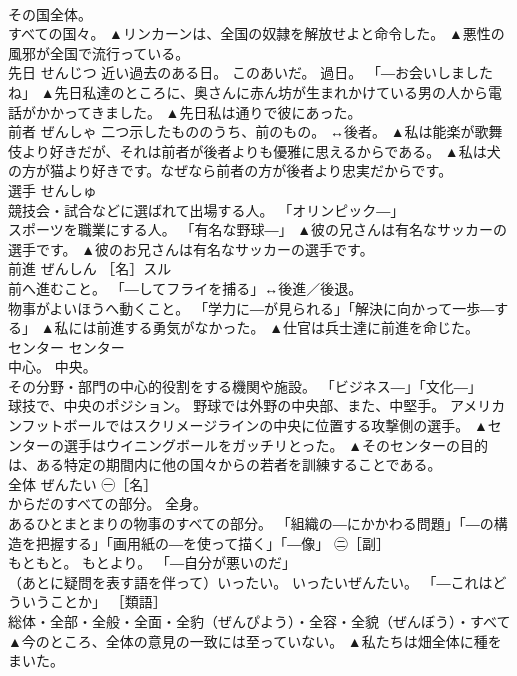 \documentclass[8pt]{extreport}
\begin{document}
\begin{CJK}{UTF8}{min}
\\	その国全体。 
\\	すべての国々。	▲リンカーンは、全国の奴隷を解放せよと命令した。 ▲悪性の風邪が全国で流行っている。
\\	先日	せんじつ	近い過去のある日。 このあいだ。 過日。 「―お会いしましたね」	▲先日私達のところに、奥さんに赤ん坊が生まれかけている男の人から電話がかかってきました。 ▲先日私は通りで彼にあった。
\\	前者	ぜんしゃ	二つ示したもののうち、前のもの。 ↔後者。	▲私は能楽が歌舞伎より好きだが、それは前者が後者よりも優雅に思えるからである。 ▲私は犬の方が猫より好きです。なぜなら前者の方が後者より忠実だからです。
\\	選手	せんしゅ	
\\	競技会・試合などに選ばれて出場する人。 「オリンピック―」 
\\	スポーツを職業にする人。 「有名な野球―」	▲彼の兄さんは有名なサッカーの選手です。 ▲彼のお兄さんは有名なサッカーの選手です。
\\	前進	ぜんしん	［名］スル 
\\	前へ進むこと。 「―してフライを捕る」↔後進／後退。 
\\	物事がよいほうへ動くこと。 「学力に―が見られる」「解決に向かって一歩―する」	▲私には前進する勇気がなかった。 ▲仕官は兵士達に前進を命じた。
\\	センター	センター	
\\	中心。 中央。 
\\	その分野・部門の中心的役割をする機関や施設。 「ビジネス―」「文化―」 
\\	球技で、中央のポジション。 野球では外野の中央部、また、中堅手。 アメリカンフットボールではスクリメージラインの中央に位置する攻撃側の選手。	▲センターの選手はウイニングボールをガッチリとった。 ▲そのセンターの目的は、ある特定の期間内に他の国々からの若者を訓練することである。
\\	全体	ぜんたい	㊀［名］ 
\\	からだのすべての部分。 全身。 
\\	あるひとまとまりの物事のすべての部分。 「組織の―にかかわる問題」「―の構造を把握する」「画用紙の―を使って描く」「―像」 ㊁［副］ 
\\	もともと。 もとより。 「―自分が悪いのだ」 
\\	（あとに疑問を表す語を伴って）いったい。 いったいぜんたい。 「―これはどういうことか」 ［類語］ 
\\	総体・全部・全般・全面・全豹（ぜんぴよう）・全容・全貌（ぜんぼう）・すべて	▲今のところ、全体の意見の一致には至っていない。 ▲私たちは畑全体に種をまいた。

\end{CJK}
\end{document}
